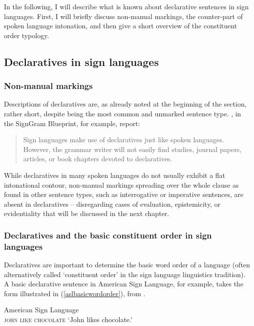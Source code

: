 In the following, I will describe what is known about declarative sentences in sign languages. First, I will briefly discuss non-manual markings, the counter-part of spoken language intonation, and then give a short overview of the constituent order typology.

\subsection{Declaratives in sign languages}
\subsubsection{Non-manual markings}
Descriptions of declaratives are, as already noted at the beginning of the section, rather short, despite being the most common and unmarked sentence type. \citet[289]{signgram2017}, in the SignGram Blueprint, for example, report:

\begin{quote}
Sign languages make use of declaratives just like spoken languages. However, the grammar writer will not easily find studies, journal papers, articles, or book chapters devoted to declaratives.
\end{quote}

\noindent While declaratives in many spoken languages do not usually exhibit a flat intonational contour, non-manual markings spreading over the whole clause as found in other sentence types, such as interrogative or imperative sentences, are absent in declaratives -- disregarding cases of evaluation, epistemicity, or evidentiality that will be discussed in the next chapter.

\subsubsection{Declaratives and the basic constituent order in sign languages}
Declaratives are important to determine the basic word order of a language (often alternatively called `constituent order' in the sign language linguistics tradition). A basic declarative sentence in American Sign Language, for example, takes the form illustrated in (\ref{aslbasicwordorder}), from \citet[81]{neidle2000syntax}.

\begin{exe}
\ex American Sign Language\\
\textsc{john like chocolate}
\glt `John likes chocolate.'\label{aslbasicwordorder}
\end{exe}

